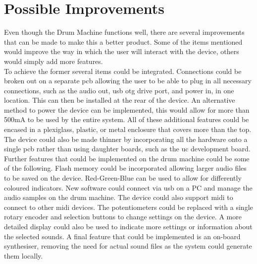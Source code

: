 \documentclass[12pt,a4paper]{report}
\begin{document}
\section{Possible Improvements}
Even though the Drum Machine functions well, there are several improvements that can be made to make this a better product. Some of the items mentioned would improve the way in which the user will interact with the device, others would simply add more features.\\
To achieve the former several items could be integrated. Connections could be broken out on a separate \ac{pcb} allowing the user to be able to plug in all necessary connections, such as the audio out, \ac{usb} \ac{otg} drive port, and power in, in one location. This can then be installed at the rear of the device. An alternative method to power the device can be implemented, this would allow for more than 500mA \cite{f411brd} to be used by the entire system. All of these additional features could be encased in a plexiglass, plastic, or metal enclosure that covers more than the top. The device could also be made thinner by incorporating all the hardware onto a single \ac{pcb} rather than using daughter boards, such as the \ac{uc} development board. \\
Further features that could be implemented on the drum machine could be some of the following. Flash memory could be incorporated allowing larger audio files to be saved on the device. Red-Green-Blue  can be used to allow for differently coloured indicators. New software could connect via \ac{usb} on a PC and manage the audio samples on the drum machine. The device could also support \ac{midi} to connect to other \ac{midi} devices. The potentiometers could be replaced with a single rotary encoder and selection buttons to change settings on the device. A more detailed display could also be used to indicate more settings or information about the selected sounds. A final feature that could be implemented is an on-board synthesiser, removing the need for actual sound files as the system could generate them locally.

\newpage
\printbibliography


\end{document}
